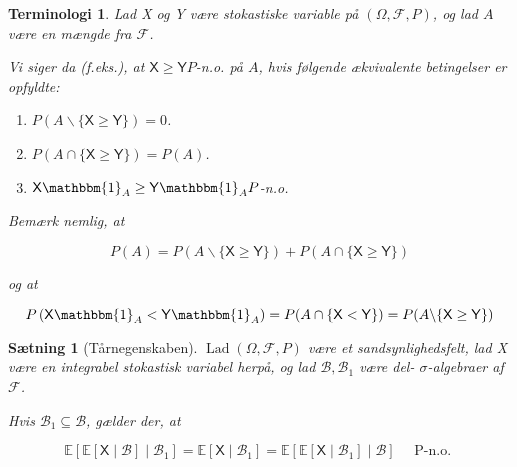 \documentclass{article}
\newcommand{\1}{\mathbbm{1}}
\newcommand{\X}{\mathsf{X}}
\newcommand{\Y}{\mathsf{Y}}
\theoremstyle{boxed}
\newtheorem{proposition}[theorem]{Sætning}
\newtheorem{terminology}[theorem]{Terminologi}
\begin{document}
\begin{theorem-box}
    \begin{terminology}
        Lad X og Y være stokastiske variable på $(\Omega, \mathcal{F}, P)$, og lad $A$ være en mængde fra $\mathcal{F}$.

        Vi siger da (f.eks.), at $\X \geq \Y P$-n.o. på $A$, hvis følgende ækvivalente betingelser er opfyldte:
        \begin{enumerate}
            \item[(1)] $P(A \backslash\{\X \geq \Y\})=0$.
            \item[(2)] $P(A \cap\{\X \geq \Y\})=P(A)$.
            \item[(3)] $\X \1_A \geq \Y \1_A P$-n.o.
        \end{enumerate}
    
        Bemærk nemlig, at
        
        $$
        P(A)=P(A \backslash\{\X \geq \Y\})+P(A \cap\{\X \geq \Y\})
        $$
        
        og at
        
        $$
        P\left(\X \1_A<\Y \1_A\right)=P(A \cap\{\X<\Y\})=P(A \backslash\{\X \geq \Y\})
        $$
        
    \end{terminology}
\end{theorem-box}
\begin{theorem-box}
    \begin{proposition}[Tårnegenskaben]
        $\operatorname{Lad}(\Omega, \mathcal{F}, P)$ være et sandsynlighedsfelt, lad X være en integrabel stokastisk variabel herpå, og lad $\mathcal{B}, \mathcal{B}_1$ være del- $\sigma$-algebraer af $\mathcal{F}$.

Hvis $\mathcal{B}_1 \subseteq \mathcal{B}$, gælder der, at

$$
\mathbb{E}\left[\mathbb{E}[\X \mid \mathcal{B}] \mid \mathcal{B}_1\right]=\mathbb{E}\left[\X \mid \mathcal{B}_1\right]=\mathbb{E}\left[\mathbb{E}\left[\X \mid \mathcal{B}_1\right] \mid \mathcal{B}\right] \quad \text { P-n.o. }
$$
    \end{proposition}
\end{theorem-box}
\end{document}
